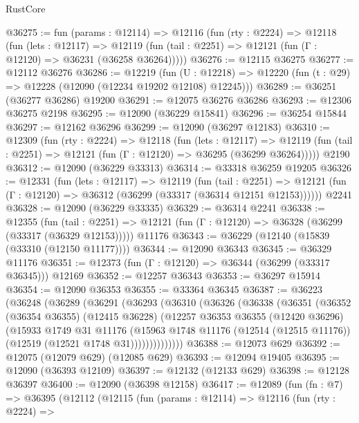 \begin{lexlean}{RustCore}
\begin{coremodule}
@36275 := fun (params : @12114) =>
  @12116
    (fun (rty : @2224) =>
    @12118
      (fun (lets : @12117) =>
      @12119 (fun (tail : @2251) => @12121 (fun (Γ : @12120) => @36231 (@36258 @36264)))))
@36276 := @12115 @36275
@36277 := @12112 @36276
@36286 := @12219
    (fun (U : @12218) => @12220 (fun (t : @29) => @12228 (@12090 (@12234 @19202 @12108) @12245)))
@36289 := @36251 (@36277 @36286) @19200
@36291 := @12075 @36276 @36286
@36293 := @12306 @36275 @2198
@36295 := @12090 (@36229 @15841)
@36296 := @36254 @15844
@36297 := @12162 @36296
@36299 := @12090 (@36297 @12183)
@36310 := @12309
    (fun (rty : @2224) =>
    @12118
      (fun (lets : @12117) =>
      @12119 (fun (tail : @2251) => @12121 (fun (Γ : @12120) => @36295 (@36299 @36264)))))
    @2190
@36312 := @12090 (@36229 @33313)
@36314 := @33318 @36259 @19205
@36326 := @12331
    (fun (lets : @12117) =>
    @12119
      (fun (tail : @2251) =>
      @12121 (fun (Γ : @12120) => @36312 (@36299 (@33317 (@36314 @12151 @12153))))))
    @2241
@36328 := @12090 (@36229 @33335)
@36329 := @36314 @2241
@36338 := @12355
    (fun (tail : @2251) => @12121 (fun (Γ : @12120) => @36328 (@36299 (@33317 (@36329 @12153)))))
    @11176
@36343 := @36229 (@12140 (@15839 (@33310 (@12150 @11177))))
@36344 := @12090 @36343
@36345 := @36329 @11176
@36351 := @12373 (fun (Γ : @12120) => @36344 (@36299 (@33317 @36345))) @12169
@36352 := @12257 @36343
@36353 := @36297 @15914
@36354 := @12090 @36353
@36355 := @33364 @36345
@36387 := @36223
    (@36248
      (@36289
        (@36291
          (@36293
            (@36310
              (@36326
                (@36338
                  (@36351
                    (@36352
                      (@36354 @36355)
                      (@12415 @36228)
                      (@12257
                        @36353
                        @36355
                        (@12420 @36296)
                        (@15933
                          @1749
                          @31
                          @11176
                          (@15963
                            @1748
                            @11176
                            (@12514 (@12515 @11176))
                            (@12519 (@12521 @1748 @31))))))))))))))
@36388 := @12073 @629
@36392 := @12075 (@12079 @629) (@12085 @629)
@36393 := @12094 @19405
@36395 := @12090 (@36393 @12109)
@36397 := @12132 (@12133 @629)
@36398 := @12128 @36397
@36400 := @12090 (@36398 @12158)
@36417 := @12089
    (fun (fn : @7) =>
    @36395
      (@12112
        (@12115
          (fun (params : @12114) =>
          @12116
            (fun (rty : @2224) =>

\end{coremodule}
\end{lexlean}
